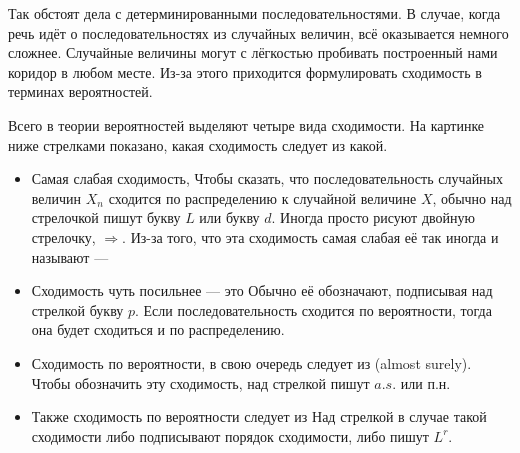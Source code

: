 \documentclass[12pt, a4paper, oneside]{article}
\begin{document}
Так обстоят дела с детерминированными последовательностями. В случае, когда речь идёт о последовательностях из случайных величин, всё оказывается немного сложнее. Случайные величины могут с лёгкостью пробивать построенный нами коридор в любом месте. Из-за этого приходится формулировать сходимость в терминах вероятностей. 

Всего в теории вероятностей выделяют четыре вида сходимости. На картинке ниже стрелками показано, какая сходимость следует из какой. 

\begin{center} 
\end{center} 

\begin{itemize} 
\item Самая слабая сходимость,  Чтобы сказать, что последовательность случайных величин $X_n$ сходится по распределению к случайной величине $X$, обычно над стрелочкой пишут букву $L$ или букву $d$. Иногда просто рисуют двойную стрелочку, $\Rightarrow$. Из-за того, что эта сходимость самая слабая её так иногда и называют --- 

\item Сходимость чуть посильнее --- это  Обычно её обозначают, подписывая над стрелкой букву $p$. Если последовательность сходится по вероятности, тогда она будет сходиться и по распределению. 

\item Сходимость по вероятности, в свою очередь следует из  (almost surely). Чтобы обозначить эту сходимость, над стрелкой пишут $a.s.$ или п.н.

\item Также сходимость по вероятности следует из  Над стрелкой в случае такой сходимости либо подписывают порядок сходимости, либо пишут $L^r$. 
\end{itemize} 
\end{document}
